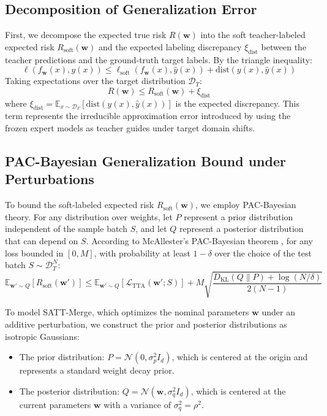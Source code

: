 \documentclass{article}
\begin{document}
\subsection{Decomposition of Generalization Error}
First, we decompose the expected true risk $R(\mathbf{w})$ into the soft teacher-labeled expected risk $R_{\text{soft}}(\mathbf{w})$ and the expected labeling discrepancy $\xi_{\text{dist}}$ between the teacher predictions and the ground-truth target labels. By the triangle inequality:
\begin{equation}
    \ell(f_{\mathbf{w}}(x), y(x)) \le \ell_{\text{soft}}(f_{\mathbf{w}}(x), \hat{y}(x)) + \text{dist}(y(x), \hat{y}(x))
\end{equation}
Taking expectations over the target distribution $\mathcal{D}_T$:
\begin{equation}
    R(\mathbf{w}) \le R_{\text{soft}}(\mathbf{w}) + \xi_{\text{dist}}
    \label{eq:decomp}
\end{equation}
where $\xi_{\text{dist}} = \mathbb{E}_{x \sim \mathcal{D}_T} [ \text{dist}(y(x), \hat{y}(x)) ]$ is the expected discrepancy. This term represents the irreducible approximation error introduced by using the frozen expert models as teacher guides under target domain shifts.

\subsection{PAC-Bayesian Generalization Bound under Perturbations}
To bound the soft-labeled expected risk $R_{\text{soft}}(\mathbf{w})$, we employ PAC-Bayesian theory. For any distribution over weights, let $P$ represent a prior distribution independent of the sample batch $S$, and let $Q$ represent a posterior distribution that can depend on $S$. 
According to McAllester's PAC-Bayesian theorem \cite{mcallester1999pac}, for any loss bounded in $[0, M]$, with probability at least $1 - \delta$ over the choice of the test batch $S \sim \mathcal{D}_T^N$:
\begin{equation}
    \mathbb{E}_{\mathbf{w}' \sim Q} [ R_{\text{soft}}(\mathbf{w}') ] \le \mathbb{E}_{\mathbf{w}' \sim Q} [ \mathcal{L}_{\text{TTA}}(\mathbf{w}'; S) ] + M \sqrt{\frac{D_{\text{KL}}(Q \parallel P) + \log(N / \delta)}{2(N - 1)}}
    \label{eq:mcallester}
\end{equation}

To model SATT-Merge, which optimizes the nominal parameters $\mathbf{w}$ under an additive perturbation, we construct the prior and posterior distributions as isotropic Gaussians:
\begin{itemize}
    \item The prior distribution: $P = \mathcal{N}(0, \sigma_p^2 I_d)$, which is centered at the origin and represents a standard weight decay prior.
    \item The posterior distribution: $Q = \mathcal{N}(\mathbf{w}, \sigma_q^2 I_d)$, which is centered at the current parameters $\mathbf{w}$ with a variance of $\sigma_q^2 = \rho^2$.
\end{itemize}
\end{document}
